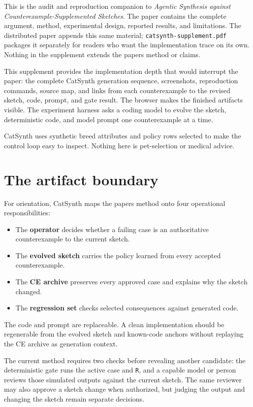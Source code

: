 This is the audit and reproduction companion to \emph{Agentic Synthesis against
Counterexample-Supplemented Sketches}. The paper contains the complete argument, method,
experimental design, reported results, and limitations. The distributed paper appends this same
material; \texttt{catsynth-supplement.pdf} packages it separately for readers who want the implementation
trace on its own. Nothing in the supplement extends the paper\textquotesingle s method or claims.

This supplement provides the implementation depth that would interrupt the paper: the complete
CatSynth generation sequence, screenshots, reproduction commands, source map, and links from
each counterexample to the revised sketch, code, prompt, and gate result. The browser makes the
finished artifacts visible. The experiment harness asks a coding model to evolve the sketch,
deterministic code, and model prompt one counterexample at a time.

CatSynth uses synthetic breed attributes and policy rows selected to make the control loop easy
to inspect. Nothing here is pet-selection or medical advice.

\section{The artifact boundary}\label{the-artifact-boundary}

For orientation, CatSynth maps the paper\textquotesingle s method onto four operational responsibilities:

\begin{itemize}
\tightlist
\item
  The \textbf{operator} decides whether a failing case is an authoritative counterexample to the
  current sketch.
\item
  The \textbf{evolved sketch} carries the policy learned from every accepted counterexample.
\item
  The \textbf{CE archive} preserves every approved case and explains why the sketch changed.
\item
  The \textbf{regression set} checks selected consequences against generated code.
\end{itemize}

The code and prompt are replaceable. A clean implementation should be regenerable from the
evolved sketch and known-code anchors without replaying the CE archive as generation context.

The current method requires two checks before revealing another candidate: the deterministic
gate runs the active case and \texttt{R}, and a capable model or person reviews those simulated outputs
against the current sketch. The same reviewer may also approve a sketch change when authorized,
but judging the output and changing the sketch remain separate decisions.

